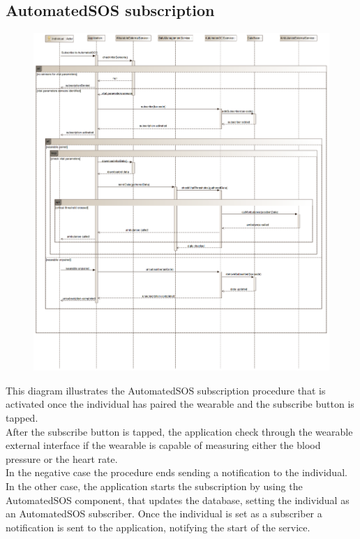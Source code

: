 \subsection{AutomatedSOS subscription}
\begin{figure}[H]
\centering
\includegraphics[width=\linewidth]{resources/uml/sequence/AutomatedSOS.png}
\end{figure}
This diagram illustrates the AutomatedSOS subscription procedure that is activated once the individual has paired the wearable and the subscribe button is tapped.\\
After the subscribe button is tapped, the application check through the wearable external interface if the wearable is capable of measuring either the blood pressure or the heart rate.\\
In the negative case the procedure ends sending a notification to the individual.
In the other case, the application starts the subscription by using the AutomatedSOS component, that updates the database, setting the individual as an AutomatedSOS subscriber. Once the individual is set as a subscriber a notification is sent to the application, notifying the start of the service.\\
